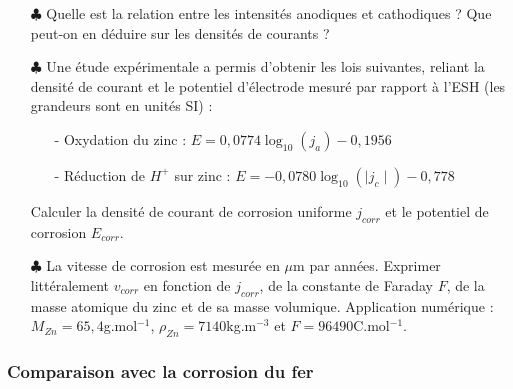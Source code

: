 \documentclass{report}
\begin{document}
\begin{itemize}

	\item[$\clubsuit$] Quelle est la relation entre les intensités anodiques et cathodiques ? Que peut-on en déduire sur les densités de courants ?
	
	\item[$\clubsuit$] Une étude expérimentale a permis d'obtenir les lois suivantes, reliant la densité de courant et le potentiel d'électrode mesuré par rapport à l'ESH (les grandeurs sont en unités SI) :
	\begin{itemize}
		\item[-] Oxydation du zinc : $E=0,0774\log_{10}(j_a)-0,1956$
		\item[-] Réduction de $H^+$ sur zinc : $E=-0,0780\log_{10}(\mid j_c\mid)-0,778$
	\end{itemize}
Calculer la densité de courant de corrosion uniforme $j_{corr}$ et le potentiel de corrosion $E_{corr}$.

	\item[$\clubsuit$] La vitesse de corrosion est mesurée en $\mu$m par années. Exprimer littéralement $v_{corr}$ en fonction de $j_{corr}$, de la constante de Faraday $F$, de la masse atomique du zinc et de sa masse volumique. Application numérique : $M_{Zn}=65,4$g.mol$^{-1}$, $\rho_{Zn}=7140$kg.m$^{-3}$ et $F=96490$C.mol$^{-1}$.
\end{itemize}

\subsubsection*{Comparaison avec la corrosion du fer}
\end{document}
